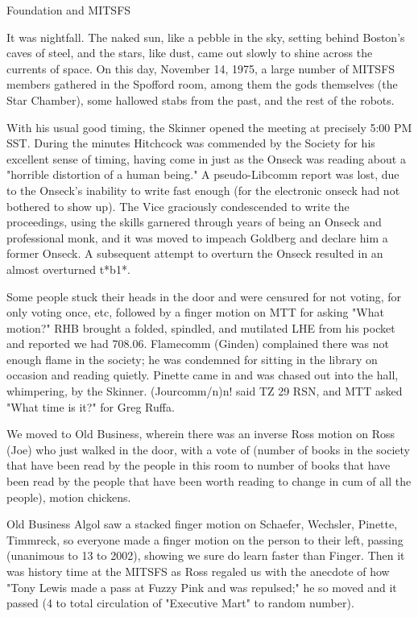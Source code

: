 \documentclass[12pt]{article}
\begin{document}
\begin{center}

Foundation and MITSFS

\end{center}
 
\vspace{12pt}

\setlength{\parskip}{6pt}

\noindent
It was nightfall. The naked sun, like a pebble in the sky, setting behind Boston's caves of steel, and the stars, like dust, came out slowly to shine across the currents of space. On this day, November 14, 1975, a large number of MITSFS members gathered in the Spofford room, among them the gods themselves (the Star Chamber), some hallowed stabs from the past, and the rest of the robots.

With his usual good timing, the Skinner opened the meeting at precisely 5:00 PM SST. During the minutes Hitchcock was commended by the Society for his excellent sense of timing, having come in just as the Onseck was reading about a "horrible distortion of a human being." A pseudo-Libcomm report was lost, due to the Onseck's inability to write fast enough (for the electronic onseck had not bothered to show up). The Vice graciously condescended to write the proceedings, using the skills garnered through years of being an Onseck and professional monk, and it was moved to impeach Goldberg and declare him a former Onseck. A subsequent attempt to overturn the Onseck resulted in an almost overturned t*b1*.

Some people stuck their heads in the door and were censured for not voting, for only voting once, etc, followed by a finger motion on MTT for asking "What motion?" RHB brought a folded, spindled, and mutilated LHE from his pocket and reported we had 708.06. Flamecomm (Ginden) complained there was not enough flame in the society; he was condemned for sitting in the library on occasion and reading quietly. Pinette came in and was chased out into the hall, whimpering, by the Skinner. (Jourcomm/n)n! said TZ 29 RSN, and MTT asked "What time is it?" for Greg Ruffa.

We moved to Old Business, wherein there was an inverse Ross motion on Ross (Joe) who just walked in the door, with a vote of (number of books in the society that have been read by the people in this room to number of books that have been read by the people that have been worth reading to change in cum of all the people), motion chickens.

Old Business Algol saw a stacked finger motion on Schaefer, Wechsler, Pinette, Timmreck, so everyone made a finger motion on the person to their left, passing (unanimous to 13 to 2002), showing we sure do learn faster than Finger. Then it was history time at the MITSFS as Ross regaled us with the anecdote of how "Tony Lewis made a pass at Fuzzy Pink and was repulsed;" he so moved and it passed (4 to total circulation of "Executive Mart" to random number).
\end{document}
